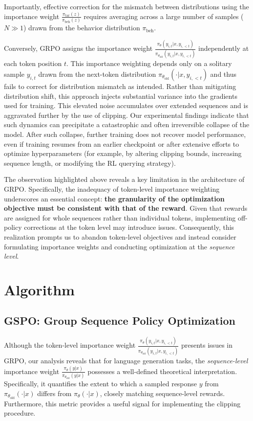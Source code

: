 Importantly, effective correction for the mismatch between distributions using the importance weight $\frac{ \pi_\text{tar} (z) }{ \pi_\text{beh} (z)}$ requires averaging across a large number of samples ($N \gg 1$) drawn from the behavior distribution $\pi_\text{beh}$.

Conversely, GRPO assigns the importance weight $\frac{ \pi_{\theta} (y_{i,t} | x, y_{i,<t}) }{ \pi_{\theta_\text{old}} (y_{i,t} | x,y_{i,<t})}$ independently at each token position $t$. This importance weighting depends only on a solitary sample $y_{i,t}$ drawn from the next-token distribution $\pi_{\theta_\text{old}}( \cdot | x, y_{i,<t})$ and thus fails to correct for distribution mismatch as intended. Rather than mitigating distribution shift, this approach injects substantial variance into the gradients used for training. This elevated noise accumulates over extended sequences and is aggravated further by the use of clipping. Our experimental findings indicate that such dynamics can precipitate a catastrophic and often irreversible collapse of the model. After such collapse, further training does not recover model performance, even if training resumes from an earlier checkpoint or after extensive efforts to optimize hyperparameters (for example, by altering clipping bounds, increasing sequence length, or modifying the RL querying strategy).

The observation highlighted above reveals a key limitation in the architecture of GRPO. Specifically, the inadequacy of token-level importance weighting underscores an essential concept: \textbf{the granularity of the optimization objective must be consistent with that of the reward}. Given that rewards are assigned for whole sequences rather than individual tokens, implementing off-policy corrections at the token level may introduce issues. Consequently, this realization prompts us to abandon token-level objectives and instead consider formulating importance weights and conducting optimization at the \textit{sequence level}.

\section{Algorithm}

\subsection{GSPO: Group Sequence Policy Optimization}

Although the token-level importance weight $\frac{ \pi_{\theta} (y_{i,t} | x, y_{i,<t}) }{ \pi_{\theta_\text{old}} (y_{i,t} | x,y_{i,<t})}$ presents issues in GRPO, our analysis reveals that for language generation tasks, the \textit{sequence-level} importance weight $\frac{ \pi_{\theta} (y | x) }{ \pi_{\theta_\text{old}} (y | x)}$ possesses a well-defined theoretical interpretation. Specifically, it quantifies the extent to which a sampled response $y$ from $\pi_{\theta_\text{old}} (\cdot | x)$ differs from $\pi_{\theta} (\cdot | x)$, closely matching sequence-level rewards. Furthermore, this metric provides a useful signal for implementing the clipping procedure.

